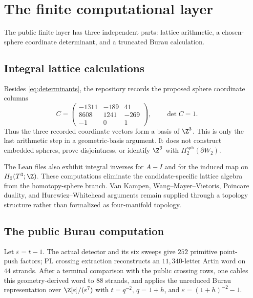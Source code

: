 \section{The finite computational layer}

The public finite layer has three independent parts: lattice arithmetic, a
chosen-sphere coordinate determinant, and a truncated Burau calculation.

\subsection{Integral lattice calculations}

Besides \eqref{eq:determinants}, the repository records the proposed sphere
coordinate columns
\begin{equation}\label{eq:spherecols}
C=\begin{pmatrix}
-1311&-189&41\\
8608&1241&-269\\
-1&0&1
\end{pmatrix},
\qquad \det C=1.
\end{equation}
Thus the three recorded coordinate vectors form a basis of $\Z^3$.  This is
only the last arithmetic step in a geometric-basis argument.  It does not
construct embedded spheres, prove disjointness, or identify $\Z^3$ with
$H_2^{\mathrm{sph}}(\partial W_2)$.

The Lean files also exhibit integral inverses for $A-I$ and for the induced
map on $H_2(T^3;\Z)$.  These computations eliminate the candidate-specific
lattice algebra from the homotopy-sphere branch.  Van Kampen,
Wang--Mayer--Vietoris, Poincare duality, and Hurewicz--Whitehead arguments
remain supplied through a topology structure rather than formalized as
four-manifold topology.

\subsection{The public Burau computation}

Let $\varepsilon=t-1$.  The actual detector and its six sweeps give $252$
primitive point-push factors; PL crossing extraction reconstructs an
$11{,}340$-letter Artin word on $44$ strands.  After a terminal comparison
with the public crossing rows, one cables this geometry-derived word to $88$ strands,
and applies the unreduced Burau representation over
$\Z[\varepsilon]/(\varepsilon^7)$ with $t=q^{-2}$, $q=1+h$, and
$\varepsilon=(1+h)^{-2}-1$.

